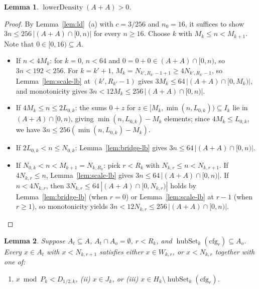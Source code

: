 \documentclass[11pt,a4paper]{amsart}
\newtheorem{lemma}{Lemma}
\newcommand{\hubSet}{\operatorname{hubSet}}
\newcommand{\lowerDensity}{\operatorname{lowerDensity}}
\begin{document}
\begin{lemma}\label{lem:ld-pos}
$\lowerDensity(A + A) > 0$.
\end{lemma}

\begin{proof}
By Lemma~\ref{lem:ld}~(a) with $c = 3 / 256$ and $n_0 = 16$, it suffices to show $3 n \le 256 \, |(A + A) \cap [0, n)|$ for every $n \ge 16$. Choose $k$ with $M_k \le n < M_{k+1}$. Note that $0 \in [0, 16) \subseteq A$.
\begin{itemize}
\item If $n < 4 M_k$: for $k = 0$, $n < 64$ and $0 = 0 + 0 \in (A + A) \cap [0, n)$, so $3 n < 192 < 256$. For $k = k' + 1$, $M_k = N_{k', R_{k'} - 1 + 1} \ge 4 N_{k', R_{k'} - 1}$, so Lemma~\ref{lem:scale-lb} at $(k', R_{k'} - 1)$ gives $3 M_k \le 64 \, |(A + A) \cap [0, M_k)|$, and monotonicity gives $3 n < 12 M_k \le 256 \, |(A + A) \cap [0, n)|$.
\item If $4 M_k \le n \le 2 L_{0,k}$: the sums $0 + z$ for $z \in [M_k, \min(n, L_{0,k})) \subseteq I_k$ lie in $(A + A) \cap [0, n)$, giving $\min(n, L_{0,k}) - M_k$ elements; since $4 M_k \le L_{0,k}$, we have $3 n \le 256(\min(n, L_{0,k}) - M_k)$.
\item If $2 L_{0,k} < n \le N_{0,k}$: Lemma~\ref{lem:bridge-lb} gives $3 n \le 64 \, |(A + A) \cap [0, n)|$.
\item If $N_{0,k} < n < M_{k+1} = N_{k, R_k}$: pick $r < R_k$ with $N_{k,r} \le n < N_{k,r+1}$. If $4 N_{k,r} \le n$, Lemma~\ref{lem:scale-lb} gives $3 n \le 64 \, |(A + A) \cap [0, n)|$. If $n < 4 N_{k,r}$, then $3 N_{k,r} \le 64 \, |(A + A) \cap [0, N_{k,r})|$ holds by Lemma~\ref{lem:bridge-lb} (when $r = 0$) or Lemma~\ref{lem:scale-lb} at $r - 1$ (when $r \ge 1$), so monotonicity yields $3 n < 12 N_{k,r} \le 256 \, |(A + A) \cap [0, n)|$. \qedhere
\end{itemize}
\end{proof}

\begin{lemma}\label{lem:cases}
Suppose $A_t \subseteq A$, $A_t \cap A_o = \emptyset$, $r < R_k$, and $\hubSet_k(\mathrm{cfg}_r) \subseteq A_o$. Every $x \in A_t$ with $x < N_{k,r+1}$ satisfies either $x \in W_{k,r}$, or $x < N_{k,r}$ together with one of:
\begin{enumerate}
\item[(i)] $x \bmod P_k < D_{1/2,k}$, \quad (ii) $x \in J_k$, \quad or \quad (iii) $x \in H_k \setminus \hubSet_k(\mathrm{cfg}_r)$.
\end{enumerate}
\end{lemma}
\end{document}
